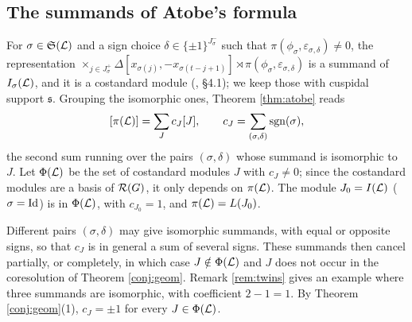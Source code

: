 \documentclass[a4paper,12pt,leqno]{amsart}
\theoremstyle{plain}
\theoremstyle{definition}
\providecommand{\frS}{\mathfrak{S}}\providecommand{\frs}{\mathfrak{s}}
\begin{document}
\subsection{The summands of Atobe's formula}\label{ssec:summands}
For $\sigma\in\frS(\caL)$ and a sign choice $\delta\in\{\pm1\}^{J^-_\sigma}$ such that
$\pi(\phi_\sigma,\varepsilon_{\sigma,\delta})\neq0$, the representation $\times_{j\in
J^+_\sigma}\Delta[x_{\sigma(j)},-x_{\sigma(t-j+1)}]\rtimes\pi(\phi_\sigma,\varepsilon_{\sigma,\delta})$ is a
summand of $I_\sigma(\mathcal{L})$, and it is a costandard module (\cite{Ato24}, \S4.1); we keep those with cuspidal 
support $\frs$. Grouping the isomorphic ones, Theorem \ref{thm:atobe} reads
\[[\pi(\mathcal{L})]=\sum_Jc_J[J],\qquad c_J=\sum_{(\sigma,\delta)}\mathrm{sgn}(\sigma),\]
the second sum running over the pairs $(\sigma,\delta)$ whose summand is isomorphic to $J$. Let
$\Phi(\mathcal{L})$ be the set of costandard modules $J$ with $c_J\neq0$; since the costandard modules are a
basis of $\mathcal{R}(G)$, it only depends on $\pi(\mathcal{L})$. The module $J_0=I(\mathcal{L})$ ($\sigma=\mathrm{Id}$) is in
$\Phi(\mathcal{L})$, with $c_{J_0}=1$, and $\pi(\mathcal{L})=L(J_0)$.

Different pairs $(\sigma,\delta)$ may give isomorphic summands, with equal or opposite signs, so that
$c_J$ is in general a sum of several signs. These summands then cancel partially, or completely, in
which case $J\notin\Phi(\mathcal{L})$ and $J$ does not occur in the coresolution of Theorem \ref{conj:geom}.
Remark \ref{rem:twins} gives an example where three summands are isomorphic, with coefficient
$2-1=1$. By Theorem \ref{conj:geom}(1), $c_J=\pm1$ for every $J\in\Phi(\mathcal{L})$.
\end{document}
